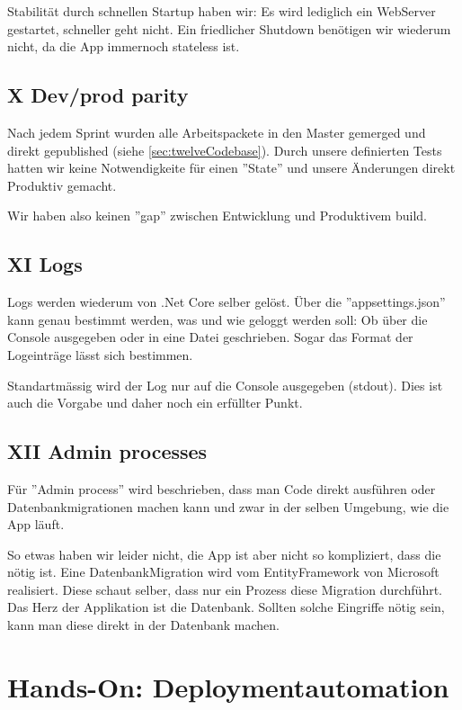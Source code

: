 \documentclass[11pt,titlepage]{article}
\begin{document}
Stabilität durch schnellen Startup haben wir: Es wird lediglich ein WebServer gestartet, schneller geht nicht.
Ein friedlicher Shutdown benötigen wir wiederum nicht, da die App immernoch stateless ist.

\subsection{X Dev/prod parity}
\label{sec:twelveParity}

Nach jedem Sprint wurden alle Arbeitspackete in den Master gemerged und direkt gepublished (siehe \autoref{sec:twelveCodebase}). Durch unsere definierten Tests hatten wir keine Notwendigkeite für einen ''State'' und unsere Änderungen direkt Produktiv gemacht.
\par\medskip
Wir haben also keinen ''gap'' zwischen Entwicklung und Produktivem build.

\subsection{XI Logs}
\label{sec:twelveLogs}

Logs werden wiederum von .Net Core selber gelöst. Über die ''appsettings.json'' kann genau bestimmt werden, was und wie geloggt werden soll: Ob über die Console ausgegeben oder in eine Datei geschrieben. Sogar das Format der Logeinträge lässt sich bestimmen.
\par\medskip
Standartmässig wird der Log nur auf die Console ausgegeben (stdout). Dies ist auch die Vorgabe und daher noch ein erfüllter Punkt.

\subsection{XII Admin processes}
\label{sec:twelveAdmin}

Für ''Admin process'' wird beschrieben, dass man Code direkt ausführen oder Datenbankmigrationen machen kann und zwar in der selben Umgebung, wie die App läuft.
\par\medskip
So etwas haben wir leider nicht, die App ist aber nicht so kompliziert, dass die nötig ist. Eine DatenbankMigration wird vom EntityFramework von Microsoft realisiert. Diese schaut selber, dass nur ein Prozess diese Migration durchführt.
Das Herz der Applikation ist die Datenbank. Sollten solche Eingriffe nötig sein, kann man diese direkt in der Datenbank machen.

\section{Hands-On: Deploymentautomation}
\label{sec:handsOnDeploitment}
\end{document}

